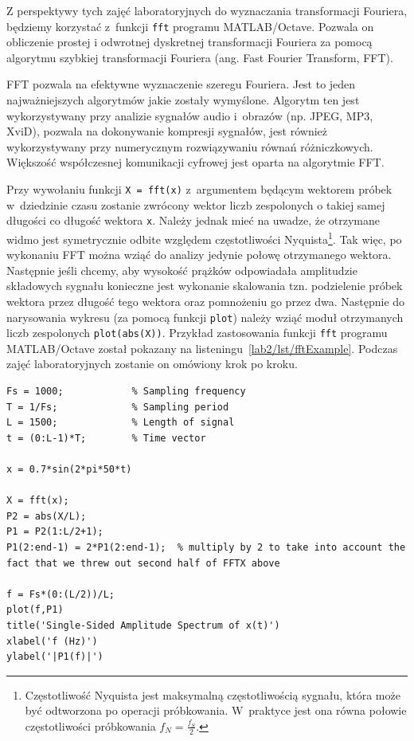 Z perspektywy tych zajęć laboratoryjnych do wyznaczania transformacji Fouriera, będziemy korzystać z~funkcji \texttt{fft} programu MATLAB/Octave. Pozwala on obliczenie prostej i odwrotnej dyskretnej transformacji Fouriera za pomocą algorytmu szybkiej transformacji Fouriera (ang. Fast Fourier Transform, FFT).

FFT pozwala na efektywne wyznaczenie szeregu Fouriera. Jest to jeden najważniejszych algorytmów jakie zostały wymyślone. Algorytm ten jest wykorzystywany przy analizie sygnałów audio i~obrazów (np. JPEG, MP3, XviD), pozwala na dokonywanie kompresji sygnałów, jest również wykorzystywany przy numerycznym rozwiązywaniu równań różniczkowych. Większość współczesnej komunikacji cyfrowej jest oparta na algorytmie FFT. 

Przy wywołaniu funkcji \texttt{X = fft(x)} z~argumentem będącym wektorem próbek w~dziedzinie czasu zostanie zwrócony wektor liczb zespolonych o takiej samej długości co długość wektora \texttt{x}. Należy jednak mieć na uwadze, że otrzymane widmo jest symetrycznie odbite względem częstotliwości Nyquista\footnote{Częstotliwość Nyquista jest maksymalną częstotliwością sygnału, która może być odtworzona po operacji próbkowania. W~praktyce jest ona równa połowie częstotliwości próbkowania $f_N = \frac{f_S}{2}$.}. Tak więc, po wykonaniu FFT można wziąć do analizy jedynie połowę otrzymanego wektora. Następnie jeśli chcemy, aby wysokość prążków odpowiadała amplitudzie składowych sygnału konieczne jest wykonanie skalowania tzn. podzielenie próbek wektora przez długość tego wektora oraz pomnożeniu go przez dwa. Następnie do narysowania wykresu (za pomocą funkcji \texttt{plot}) należy wziąć moduł otrzymanych liczb zespolonych \texttt{plot(abs(X))}. Przykład zastosowania funkcji \texttt{fft} programu MATLAB/Octave został pokazany na listeningu~\ref{lab2/lst/fftExample}. Podczas zajęć laboratoryjnych zostanie on omówiony krok po kroku.

\begin{lstlisting}[caption=Przykład użycia funkcji \texttt{fft} programu MATLAB/Octave , label=lab2/lst/fftExample]
Fs = 1000;            % Sampling frequency                    
T = 1/Fs;             % Sampling period       
L = 1500;             % Length of signal
t = (0:L-1)*T;        % Time vector

x = 0.7*sin(2*pi*50*t)	
	
X = fft(x);
P2 = abs(X/L);
P1 = P2(1:L/2+1);
P1(2:end-1) = 2*P1(2:end-1);  % multiply by 2 to take into account the fact that we threw out second half of FFTX above

f = Fs*(0:(L/2))/L;
plot(f,P1) 
title('Single-Sided Amplitude Spectrum of x(t)')
xlabel('f (Hz)')
ylabel('|P1(f)|')
\end{lstlisting}



